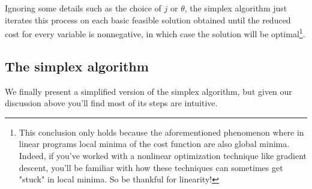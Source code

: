 \documentclass{paper}
\begin{document}
\medskip
Ignoring some details such as the choice of $j$ or $\theta$, the simplex algorithm just iterates this process on each basic feasible solution obtained until the reduced cost for every variable is nonnegative, in which case the solution will be optimal\footnote{This conclusion only holds because the aforementioned phenomenon where in linear programs local minima of the cost function are also global minima. Indeed, if you've worked with a nonlinear optimization technique like gradient descent, you'll be familiar with how these techniques can sometimes get "stuck" in local minima. So be thankful for linearity!}.

\subsection{The simplex algorithm}

We finally present a simplified version of the simplex algorithm, but given our discussion above you'll find most of its steps are intuitive. 
\end{document}
